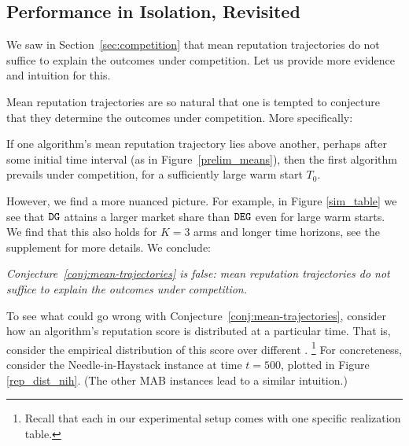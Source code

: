 \documentclass[../competing_bandits_with_appendix.tex]{subfiles}
\begin{document}
\subsection{Performance in Isolation, Revisited}\label{sec:revisited}

We saw in Section~\ref{sec:competition} that mean reputation trajectories do not suffice to explain the outcomes under competition. Let us provide more evidence and intuition for this.

Mean reputation trajectories are so natural that one is tempted to conjecture that they determine the outcomes under competition. More specifically:
\begin{conjecture}\label{conj:mean-trajectories}
If one algorithm's mean reputation trajectory lies above another, perhaps after some initial time interval (\eg as in Figure~\ref{prelim_means}), then the first algorithm prevails under competition, for a sufficiently large warm start $T_0$.
\end{conjecture}

However, we find a more nuanced picture. For example, in Figure \ref{sim_table} we see that $\mathtt{DG}$ attains a larger market share than $\mathtt{DEG}$ even for large warm starts. We find that this also holds for $K = 3$ arms and longer time horizons, see the supplement for more details. We conclude:


\begin{finding}
\textit{
Conjecture~\ref{conj:mean-trajectories} is false: mean reputation trajectories do not suffice to explain the outcomes under competition.}
\end{finding}

To see what could go wrong with Conjecture~\ref{conj:mean-trajectories}, consider how an algorithm's reputation score is distributed at a particular time. That is, consider the empirical distribution of this score over different \MRVs.%
\footnote{Recall that each \MRV in our experimental setup comes with one specific realization table.} For concreteness, consider the Needle-in-Haystack instance at time $t=500$, plotted in Figure \ref{rep_dist_nih}. (The other MAB instances lead to a similar intuition.)
\end{document}
